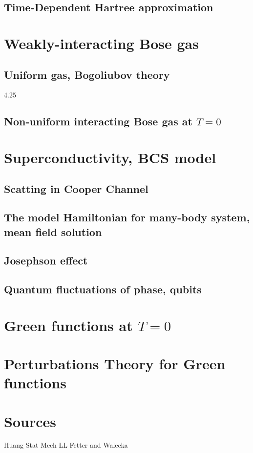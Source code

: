 \documentclass[10pt]{article}
\begin{document}
\subsection{Time-Dependent Hartree approximation}

\section{Weakly-interacting Bose gas}
\subsection{Uniform gas, Bogoliubov theory}
4.25
\subsection{Non-uniform interacting Bose gas at $T=0$}
\section{Superconductivity, BCS model}
\subsection{Scatting in Cooper Channel}
\subsection{The model Hamiltonian for many-body system, mean field solution}
\subsection{Josephson effect}
\subsection{Quantum fluctuations of phase, qubits}
\section{Green functions at $T=0$}
\section{Perturbations Theory for Green functions}

\section{Sources}
Huang Stat Mech
LL
Fetter and Walecka
\end{document}
